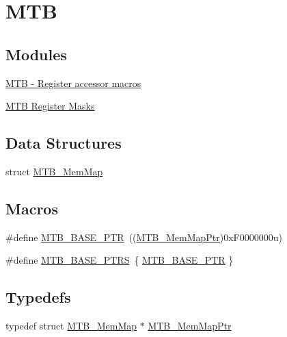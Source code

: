 \hypertarget{group___m_t_b___peripheral}{}\section{M\+TB}
\label{group___m_t_b___peripheral}
\subsection*{Modules}
\begin{DoxyCompactItemize}
\item 
\hyperlink{group___m_t_b___register___accessor___macros}{M\+T\+B -\/ Register accessor macros}
\item 
\hyperlink{group___m_t_b___register___masks}{M\+T\+B Register Masks}
\end{DoxyCompactItemize}
\subsection*{Data Structures}
\begin{DoxyCompactItemize}
\item 
struct \hyperlink{struct_m_t_b___mem_map}{M\+T\+B\+\_\+\+Mem\+Map}
\end{DoxyCompactItemize}
\subsection*{Macros}
\begin{DoxyCompactItemize}
\item 
\#define \hyperlink{group___m_t_b___peripheral_gadf7f362dfa67354951e6a23ddf08cd73}{M\+T\+B\+\_\+\+B\+A\+S\+E\+\_\+\+P\+TR}~((\hyperlink{group___m_t_b___peripheral_ga2d3d13148d5c08e92b1ad2eeb14342da}{M\+T\+B\+\_\+\+Mem\+Map\+Ptr})0x\+F0000000u)
\item 
\#define \hyperlink{group___m_t_b___peripheral_ga45b3138a9794fd8f2c7613b48646e44f}{M\+T\+B\+\_\+\+B\+A\+S\+E\+\_\+\+P\+T\+RS}~\{ \hyperlink{group___m_t_b___peripheral_gadf7f362dfa67354951e6a23ddf08cd73}{M\+T\+B\+\_\+\+B\+A\+S\+E\+\_\+\+P\+TR} \}
\end{DoxyCompactItemize}
\subsection*{Typedefs}
\begin{DoxyCompactItemize}
\item 
typedef struct \hyperlink{struct_m_t_b___mem_map}{M\+T\+B\+\_\+\+Mem\+Map} $\ast$ \hyperlink{group___m_t_b___peripheral_ga2d3d13148d5c08e92b1ad2eeb14342da}{M\+T\+B\+\_\+\+Mem\+Map\+Ptr}
\end{DoxyCompactItemize}


